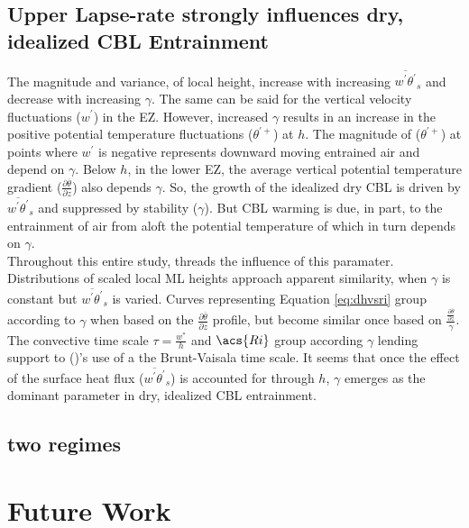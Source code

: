 \subsection{Upper Lapse-rate strongly influences dry, idealized \acs{CBL} Entrainment}

The magnitude and variance, of local height, increase with increasing $\overline{w^{'}\theta^{'}}_{s}$ and decrease with increasing $\gamma$.  The same can be said for the vertical velocity fluctuations ($w^{'}$) in the \acs{EZ}.  However, increased $\gamma$ results in an increase in the positive potential temperature fluctuations ($\theta^{'+}$) at $h$. The magnitude of ($\theta^{'+}$) at points where $w^{'}$ is negative represents downward moving entrained air and depend on $\gamma$.  Below $h$, in the lower \acs{EZ}, the average vertical potential temperature gradient ($\frac{\partial \overline{\theta}}{\partial z}$) also depends $\gamma$. So, the growth of the idealized dry \acs{CBL} is driven by $\overline{w^{'}\theta^{'}}_{s}$ and suppressed by stability ($\gamma$). But \acs{CBL} warming is due, in part, to the entrainment of air from aloft the potential temperature of which in turn depends on $\gamma$.\\

Throughout this entire study, threads the influence of this paramater.  Distributions of scaled local \acs{ML} heights approach apparent similarity, when $\gamma$ is constant but $\overline{w^{'}\theta^{'}}_{s}$ is varied.  Curves representing Equation \ref{eq:dhvsri} group according to $\gamma$ when based on the $\frac{\partial \overline{\theta}}{\partial z}$ profile, but become similar once based on $\frac{\frac{\partial \overline{\theta}}{\partial z}}{\gamma}$.  The convective time scale $\tau = \frac{w^{*}}{h}$ and $\acs{Ri}$ group according $\gamma$ lending support to \citeauthor{FedConzMir04} (\citeyear{FedConzMir04})'s use of a the Brunt-Vaisala time scale.  It seems that once the effect of the surface heat flux ($\overline{w^{'}\theta^{'}}_{s}$) is accounted for through $h$, $\gamma$ emerges as the dominant parameter in dry, idealized \acs{CBL} entrainment.\\ 

\subsection{two regimes}

\section{Future Work}


